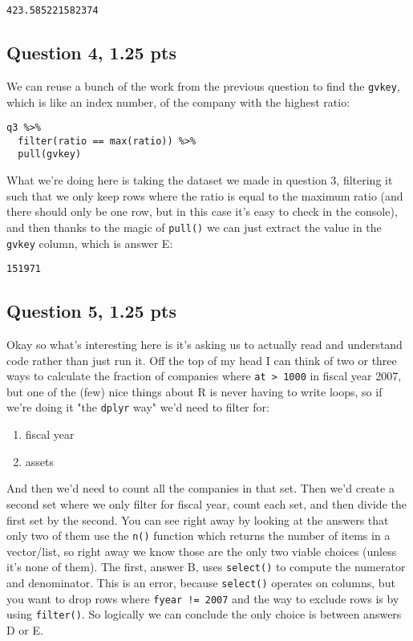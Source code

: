 \documentclass[11pt]{article}
\begin{document}
\begin{verbatim}
423.585221582374
\end{verbatim}

\subsection*{Question 4, 1.25 pts}
\label{sec:org72157d3}
We can reuse a bunch of the work from the previous question to find the \texttt{gvkey}, which is like an index number, of the company with the highest ratio:

\begin{verbatim}
q3 %>%
  filter(ratio == max(ratio)) %>%
  pull(gvkey)
\end{verbatim}
What we're doing here is taking the dataset we made in question 3, filtering it such that we only keep rows where the ratio is equal to the maximum ratio (and there should only be one row, but in this case it's easy to check in the console), and then thanks to the magic of \texttt{pull()} we can just extract the value in the \texttt{gvkey} column, which is answer E:

\begin{verbatim}
151971
\end{verbatim}

\subsection*{Question 5, 1.25 pts}
\label{sec:org2f95fc8}
Okay so what's interesting here is it's asking us to actually read and understand code rather than just run it.  Off the top of my head I can think of two or three ways to calculate the fraction of companies where \texttt{at > 1000} in fiscal year 2007, but one of the (few) nice things about R is never having to write loops, so if we're doing it "the \texttt{dplyr} way" we'd need to filter for:

\begin{enumerate}
\item fiscal year
\item assets
\end{enumerate}


And then we'd need to count all the companies in that set.  Then we'd create a second set where we only filter for fiscal year, count each set, and then divide the first set by the second.  You can see right away by looking at the answers that only two of them use the \texttt{n()} function which returns the number of items in a vector/list, so right away we know those are the only two viable choices  (unless it's none of them).  The first, answer B, uses \texttt{select()} to compute the numerator and denominator.  This is an error, because \texttt{select()} operates on columns, but you want to drop rows where \texttt{fyear != 2007} and the way to exclude rows is by using \texttt{filter()}.  So logically we can conclude the only choice is between answers D or E.
\end{document}
